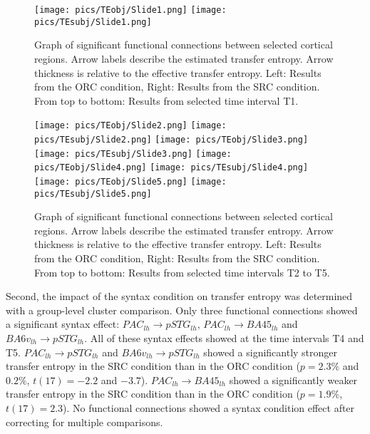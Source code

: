 \vspace{5mm}


\begin{figure}[h]
\begin{center}
\vspace{7mm}
\texttt{[image: pics/TEobj/Slide1.png]}
\texttt{[image: pics/TEsubj/Slide1.png]}
\caption{\label{4.4.networkgraph.a} Graph of significant functional connections between selected cortical regions. Arrow labels describe the estimated transfer entropy. Arrow thickness is relative to the effective transfer entropy. Left: Results from the ORC condition, Right: Results from the SRC condition. From top to bottom: Results from selected time interval T1.}
\end{center}
\end{figure}

\begin{figure}[h]
\begin{center}
\vspace{7mm}
\texttt{[image: pics/TEobj/Slide2.png]}
\texttt{[image: pics/TEsubj/Slide2.png]}
\texttt{[image: pics/TEobj/Slide3.png]}
\texttt{[image: pics/TEsubj/Slide3.png]}
\texttt{[image: pics/TEobj/Slide4.png]}
\texttt{[image: pics/TEsubj/Slide4.png]}
\texttt{[image: pics/TEobj/Slide5.png]}
\texttt{[image: pics/TEsubj/Slide5.png]}
\caption{\label{4.4.networkgraph.b} Graph of significant functional connections between selected cortical regions. Arrow labels describe the estimated transfer entropy. Arrow thickness is relative to the effective transfer entropy. Left: Results from the ORC condition, Right: Results from the SRC condition. From top to bottom: Results from selected time intervals T2 to T5.}
\end{center}
\end{figure}


Second, the impact of the syntax condition on transfer entropy was determined with a group-level cluster comparison.
Only three functional connections showed a significant syntax effect: $PAC_{lh} \rightarrow pSTG_{lh}$, $PAC_{lh} \rightarrow BA45_{lh}$ and $BA6v_{lh} \rightarrow pSTG_{lh}$.
All of these syntax effects showed at the time intervals T4 and T5.
$PAC_{lh} \rightarrow pSTG_{lh}$ and $BA6v_{lh} \rightarrow pSTG_{lh}$ showed a significantly stronger transfer entropy in the SRC condition than in the ORC condition ($p = 2.3\%$ and $0.2\%$, $t(17) = -2.2$ and $-3.7$).
$PAC_{lh} \rightarrow BA45_{lh}$ showed a significantly weaker transfer entropy in the SRC condition than in the ORC condition ($p = 1.9\%$, $t(17) = 2.3$).
No functional connections showed a syntax condition effect after correcting for multiple comparisons.
